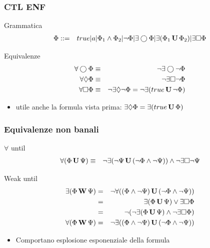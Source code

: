 \begin{frame}
  \frametitle{\ac{CTL} \ac{ENF}}
  \begin{block}{Grammatica}
   \begin{eqnarray*}
     \Phi &::=& true|a|\Phi_1\land
     \Phi_2|\neg\Phi|\exists\bigcirc\Phi|\exists(\Phi_1\,\mathbf{U}\,\Phi_2)|
     \exists\Box\Phi
   \end{eqnarray*}
  \end{block}
  \begin{block}{Equivalenze}
    \begin{eqnarray*}
      \forall\bigcirc\Phi&\equiv&\neg\exists\bigcirc\neg\Phi\\
      \forall\Diamond\Phi&\equiv&\neg\exists\Box\neg\Phi\\
      \forall\Box\Phi&\equiv&\neg\exists\Diamond\neg\Phi=\neg\exists(true\,\mathbf{U}\,\neg\Phi)
    \end{eqnarray*}
  \end{block}
  \begin{itemize}
  \item utile anche la formula vista prima: $\exists\Diamond\Phi = \exists(true\,\mathbf{U}\,\Phi)$
  \end{itemize}
\end{frame}

\begin{frame}
  \frametitle{Equivalenze non banali}
  \begin{block}{$\forall$ until}
    \begin{eqnarray*}
      \forall(\Phi\,\mathbf{U}\,\Psi)&\equiv&\neg\exists(\neg\Psi\,\mathbf{U}\,(\neg\Phi\land\neg\Psi))\land\neg\exists\Box\neg\Psi
    \end{eqnarray*}
  \end{block}
  \begin{block}{Weak until}
    \begin{eqnarray*}
    \exists(\Phi\,\mathbf{W}\,\Psi) &=&
    \neg\forall((\Phi\land\neg\Psi)\,\mathbf{U}\,(\neg\Phi\land\neg\Psi))\\
    &=&\exists(\Phi\,\mathbf{U}\,\Psi)\lor\exists\Box\Phi\\
    &=&\neg(\neg\exists(\Phi\,\mathbf{U}\,\Psi)\land\neg\exists\Box\Phi)\\
    \forall(\Phi\,\mathbf{W}\,\Psi) &=& \neg\exists((\Phi\land\neg\Psi)\,\mathbf{U}\,(\neg\Phi\land\neg\Psi))
    \end{eqnarray*}
  \end{block}
  \begin{itemize}
  \item Comportano esplosione \alert{esponenziale} della formula
  \end{itemize}
\end{frame}


